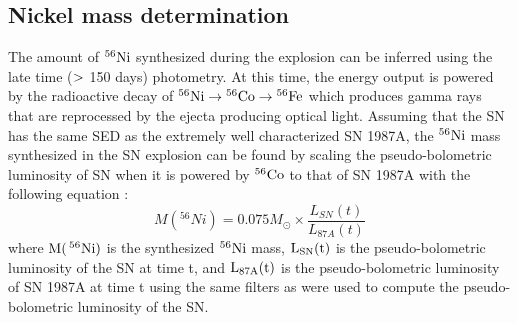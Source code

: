 \documentclass[a4paper,fleqn,usenatbib]{mnras}
\begin{document}
\subsection{Nickel mass determination}\label{Sec:Ni}
The amount of  $\rm{{}^{56}Ni}$ synthesized during the explosion can be inferred using the late time ($\rm{>}$ 150 days) photometry.
At this time, the energy output is powered by the radioactive decay of $\rm{{}^{56}Ni \rightarrow {}^{56}Co \rightarrow {}^{56}Fe}$ which produces gamma rays that are reprocessed by the ejecta producing optical light.
Assuming that the SN has the same SED as the extremely well characterized SN 1987A, the $\rm{{}^{56}Ni}$ mass synthesized in the SN explosion can be found by scaling the pseudo-bolometric luminosity of SN when it is powered by $\rm{{}^{56}Co}$ to that of SN 1987A with the following equation \citep{2014spiro}:
\begin{equation} \label{eqn:Ni}
M({}^{56}Ni) = 0.075M_{\odot} \times \frac{L_{SN}(t)}{L_{87A}(t)}
\end{equation}
where $\rm{M(\,{}^{56}Ni)}$ is the synthesized $\rm{{}^{56}Ni}$ mass, $\rm{L_{SN}(t)}$ is the pseudo-bolometric luminosity of the SN at time t, and $\rm{L_{87A}(t)}$ is the pseudo-bolometric luminosity of SN 1987A at time t using the same filters as were used to compute the pseudo-bolometric luminosity of the SN.
\end{document}
